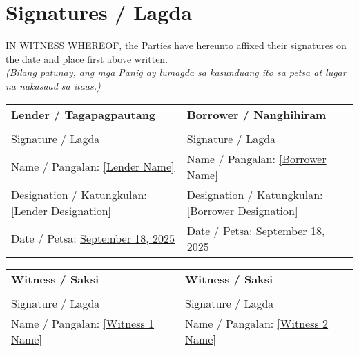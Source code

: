 \documentclass[a4paper,12pt]{article}
\begin{document}
\section*{Signatures / Lagda}
IN WITNESS WHEREOF, the Parties have hereunto affixed their signatures on the date and place first above written. \\
\textit{(Bilang patunay, ang mga Panig ay lumagda sa kasunduang ito sa petsa at lugar na nakasaad sa itaas.)}
\vspace{0.5cm}
\begin{tabular}{p{} p{}}
\textbf{Lender / Tagapagpautang} & \textbf{Borrower / Nanghihiram} \\
\vspace{2cm} \hrulefill & \vspace{2cm} \hrulefill \\
Signature / Lagda & Signature / Lagda \\
Name / Pangalan: \underline{[Lender Name]} & Name / Pangalan: \underline{[Borrower Name]} \\
Designation / Katungkulan: \underline{[Lender Designation]} & Designation / Katungkulan: \underline{[Borrower Designation]} \\
Date / Petsa: \underline{September 18, 2025} & Date / Petsa: \underline{September 18, 2025} \\
\end{tabular}
\vspace{0.5cm}
\begin{tabular}{p{} p{}}
\textbf{Witness / Saksi} & \textbf{Witness / Saksi} \\
\vspace{2cm} \hrulefill & \vspace{2cm} \hrulefill \\
Signature / Lagda & Signature / Lagda \\
Name / Pangalan: \underline{[Witness 1 Name]} & Name / Pangalan: \underline{[Witness 2 Name]} \\
\end{tabular}
\newpage
\end{document}
